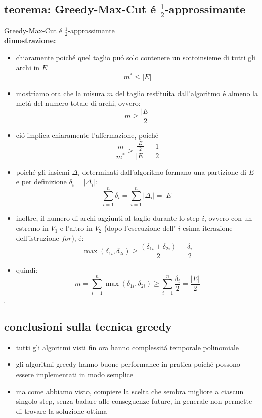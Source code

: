 \subsection*{teorema: Greedy-Max-Cut \'e $\frac{1}{2}$-approssimante}
\begin{flushleft}
	Greedy-Max-Cut \'e $\frac{1}{2}$-approssimante \newline \\
	\vspace{0.5cm}
	\textbf{dimostrazione:}
	\begin{itemize}
		\item chiaramente poich\'e quel taglio pu\'o solo contenere un sottoinsieme di tutti gli archi in $E$
			$$m^*\leq\vert E\vert$$
		\item mostriamo ora che la misura $m$ del taglio restituita dall'algoritmo \'e almeno la met\'a del numero totale di archi, ovvero:
			$$m\geq\frac{\vert E\vert}{2}$$
		\item ci\'o implica chiaramente l'affermazione, poich\'e
			$$\frac{m}{m^*}\geq\frac{\frac{\vert E\vert}{2}}{\vert E\vert}=\frac{1}{2}$$
		\item poich\'e gli insiemi $\Delta_i$ determinati dall'algoritmo formano una partizione di $E$ e per definizione $\delta_i=\vert\Delta_i\vert$:
			$$\sum_{i=1}^n\delta_i=\sum_{i=1}^n\vert\Delta_i\vert=\vert E\vert$$
		\item inoltre, il numero di archi aggiunti al taglio durante lo step $i$, ovvero con un estremo in $V_1$ e l'altro in $V_2$ (dopo l'esecuzione dell' $i$-esima iterazione dell'istruzione $for$), \'e:
			$$\max(\delta_{1i},\delta_{2i})\geq\frac{(\delta_{1i}+\delta_{2i})}{2}=\frac{\delta_i}{2}$$
		\item quindi:
			$$m=\sum_{i=1}^n\max(\delta_{1i},\delta_{2i})\geq\sum_{i=1}^n\frac{\delta_i}{2}=\frac{\vert E\vert}{2}$$
	\end{itemize}
	\hfill$\square$
\end{flushleft}


\subsection*{conclusioni sulla tecnica greedy}
\begin{flushleft}
	\begin{itemize}
		\item tutti gli algoritmi visti fin ora hanno complessit\'a temporale polinomiale
		\item gli algoritmi greedy hanno buone performance in pratica poich\'e possono essere implementati in modo semplice
		\item ma come abbiamo visto, compiere la scelta che sembra migliore a ciascun singolo step, senza badare alle conseguenze future, in generale non permette di trovare la soluzione ottima
	\end{itemize}
\end{flushleft}


\newpage
